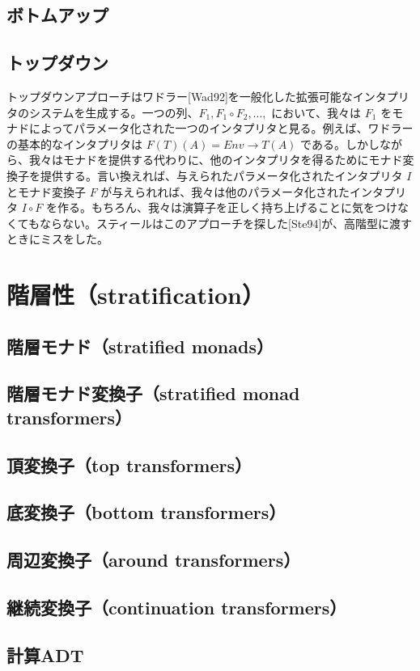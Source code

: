 \documentclass[11pt, oneside]{jsbook}   	%
\begin{document}
\section{ ボトムアップ }
\section{ トップダウン }
トップダウンアプローチはワドラー[Wad92]を一般化した拡張可能なインタプリタのシステムを生成する。一つの列、$F_1, F_1 \circ F_2, ... ,$ において、我々は $F_1$ をモナドによってパラメータ化された一つのインタプリタと見る。例えば、ワドラーの基本的なインタプリタは $F(T)(A) = Env \rightarrow T(A)$ である。しかしながら、我々はモナドを提供する代わりに、他のインタプリタを得るためにモナド変換子を提供する。言い換えれば、与えられたパラメータ化されたインタプリタ $I$ とモナド変換子 $F$ が与えられれば、我々は他のパラメータ化されたインタプリタ $I \circ F$ を作る。もちろん、我々は演算子を正しく持ち上げることに気をつけなくてもならない。スティールはこのアプローチを探した[Ste94]が、高階型に渡すときにミスをした。

\newpage
\chapter{ 階層性（stratification）}
\section{ 階層モナド（stratified monads） }
\section{ 階層モナド変換子（stratified monad transformers） }
\section{ 頂変換子（top transformers） }
\section{ 底変換子（bottom transformers） }
\section{ 周辺変換子（around transformers） }
\section{ 継続変換子（continuation transformers） }
\section{ 計算ADT }
\end{document}
